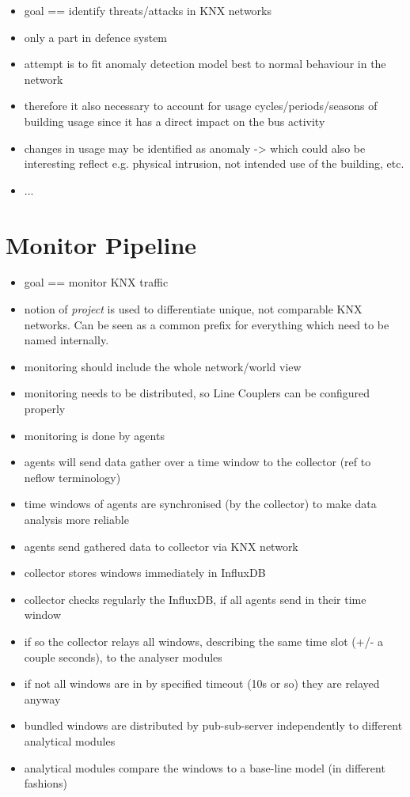 
\begin{itemize}
	\item goal == identify threats/attacks in KNX networks
	\item only a part in defence system
	\item attempt is to fit anomaly detection model best to normal behaviour in the network
	\item therefore it also necessary to account for usage cycles/periods/seasons of building usage
	\subitem since it has a direct impact on the bus activity
	\item changes in usage may be identified as anomaly -> which could also be interesting
	\subitem reflect e.g. physical intrusion, not intended use of the building, etc.
	\item ...
\end{itemize}

\section{Monitor Pipeline}
\label{sec:concept:pipeline}

\begin{itemize}
	\item goal == monitor KNX traffic
	\item notion of \emph{project} is used to differentiate unique, not comparable KNX networks. Can be seen as a common prefix for everything which need to be named internally.
	\item monitoring should include the whole network/world view
	\item monitoring needs to be distributed, so Line Couplers can be configured properly
	\item monitoring is done by agents
	\item agents will send data gather over a time window to the collector (ref to neflow terminology)
	\item time windows of agents are synchronised (by the collector) to make data analysis more reliable
	\item agents send gathered data to collector via KNX network
	\item collector stores windows immediately in InfluxDB
	\item collector checks regularly the InfluxDB, if all agents send in their time window
	\item if so the collector relays all windows, describing the same time slot (+/- a couple seconds), to the analyser modules
	\item if not all windows are in by specified timeout (10s or so) they are relayed anyway
	\item bundled windows are distributed by pub-sub-server independently to different analytical modules
	\item analytical modules compare the windows to a base-line model (in different fashions)
\end{itemize}

